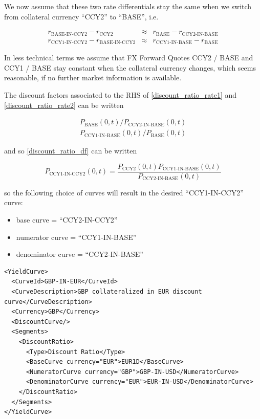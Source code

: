 We now assume that these two rate differentials stay the same when we switch from collateral currency ``CCY2'' to
``BASE'', i.e.

\begin{eqnarray}
r_{\text{BASE-IN-CCY2}} - r_{\text{CCY2}} &\approx& r_{\text{BASE}} - r_{\text{CCY2-IN-BASE}} \label{discount_ratio_rate1} \\
r_{\text{CCY1-IN-CCY2}} - r_{\text{BASE-IN-CCY2}} &\approx& r_{\text{CCY1-IN-BASE}} - r_{\text{BASE}}  \label{discount_ratio_rate2}
\end{eqnarray}

In less technical terms we assume that FX Forward Quotes CCY2 / BASE and CCY1 / BASE stay constant when the collateral
currency changes, which seems reasonable, if no further market information is available.

The discount factors associated to the RHS of \ref{discount_ratio_rate1} and \ref{discount_ratio_rate2} can be written

\begin{eqnarray}
  P_{\text{BASE}}(0,t) / P_{\text{CCY2-IN-BASE}}(0,t) \\
  P_{\text{CCY1-IN-BASE}}(0,t) / P_{\text{BASE}}(0,t)
\end{eqnarray}

and so \ref{discount_ratio_df} can be written

\begin{equation}\label{discount_ratio_df2}
  P_{\text{CCY1-IN-CCY2}}(0,t) = \frac{P_{\text{CCY2}}(0,t) P_{\text{CCY1-IN-BASE}}(0,t)}{P_{\text{CCY2-IN-BASE}}(0,t)}
\end{equation}

so the following choice of curves will result in the desired ``CCY1-IN-CCY2'' curve:

\begin{itemize}
\item base curve = ``CCY2-IN-CCY2''
\item numerator curve = ``CCY1-IN-BASE''
\item denominator curve = ``CCY2-IN-BASE''
\end{itemize}

\begin{listing}[H]
\begin{verbatim}
<YieldCurve>
  <CurveId>GBP-IN-EUR</CurveId>
  <CurveDescription>GBP collateralized in EUR discount curve</CurveDescription>
  <Currency>GBP</Currency>
  <DiscountCurve/>
  <Segments>
    <DiscountRatio>
      <Type>Discount Ratio</Type>
      <BaseCurve currency="EUR">EUR1D</BaseCurve>
      <NumeratorCurve currency="GBP">GBP-IN-USD</NumeratorCurve>
      <DenominatorCurve currency="EUR">EUR-IN-USD</DenominatorCurve>
    </DiscountRatio>
  </Segments>
</YieldCurve>
\end{verbatim}
\caption{Discount Ratio segment}
\label{lst:discount_ratio_segment}
\end{listing}

